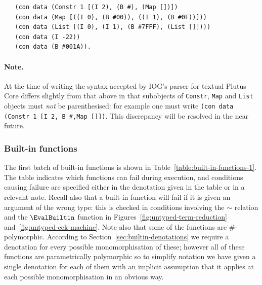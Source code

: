 \begin{verbatim}
   (con data (Constr 1 [(I 2), (B #), (Map [])])
   (con data (Map [((I 0), (B #00)), ((I 1), (B #0F))]))
   (con data (List [(I 0), (I 1), (B #7FFF), (List []])))
   (con data (I -22))
   (con data (B #001A)).
\end{verbatim}

\paragraph{Note.}  At the time of writing the syntax accepted by IOG's parser for textual Plutus Core
differs slightly from that above in that subobjects
of \texttt{Constr}, \texttt{Map} and \texttt{List} objects must \textit{not} be
parenthesised: for example one must write \verb|(con data (Constr 1 [I 2, B #,Map []])|.
This discrepancy will be resolved in the near future.


\subsubsection{Built-in functions}
\label{sec:built-in-functions-1}
The first batch of built-in functions is shown in
Table~\ref{table:built-in-functions-1}.  The table indicates which functions can
fail during execution, and conditions causing failure are specified either in
the denotation given in the table or in a relevant note.  Recall also that a
built-in function will fail if it is given an argument of the wrong type: this
is checked in conditions involving the $\sim$ relation and the $\EvalBuiltin$ function
in Figures~\ref{fig:untyped-term-reduction} and~\ref{fig:untyped-cek-machine}.
Note also that some of the functions are
\#-polymorphic.  According to Section~\ref{sec:builtin-denotations} we
require a denotation for every possible monomorphisation of these; however all
of these functions are parametrically polymorphic so to simplify notation we
have given a single denotation for each of them with an implicit assumption that
it applies at each possible monomorphisation in an obvious way.

